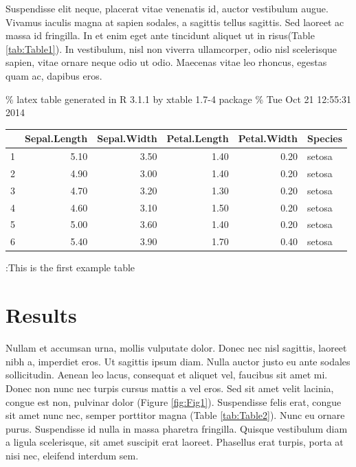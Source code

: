 \documentclass[10pt,a4paper,twocolumn]{article}
\begin{document}
Suspendisse elit neque, placerat vitae venenatis id, auctor vestibulum
augue. Vivamus iaculis magna at sapien sodales, a sagittis tellus
sagittis. Sed laoreet ac massa id fringilla. In et enim eget ante
tincidunt aliquet ut in risus(Table \ref{tab:Table1}). In vestibulum,
nisl non viverra ullamcorper, odio nisl scelerisque sapien, vitae ornare
neque odio ut odio. Maecenas vitae leo rhoncus, egestas quam ac, dapibus
eros.

\% latex table generated in R 3.1.1 by xtable 1.7-4 package \% Tue Oct
21 12:55:31 2014

\begin{table}[ht]
\centering
\begin{tabular}{rrrrrl}
  \hline
 & Sepal.Length & Sepal.Width & Petal.Length & Petal.Width & Species \\ 
  \hline
1 & 5.10 & 3.50 & 1.40 & 0.20 & setosa \\ 
  2 & 4.90 & 3.00 & 1.40 & 0.20 & setosa \\ 
  3 & 4.70 & 3.20 & 1.30 & 0.20 & setosa \\ 
  4 & 4.60 & 3.10 & 1.50 & 0.20 & setosa \\ 
  5 & 5.00 & 3.60 & 1.40 & 0.20 & setosa \\ 
  6 & 5.40 & 3.90 & 1.70 & 0.40 & setosa \\ 
   \hline
\end{tabular}
\end{table}

:This is the first example table\label{tab:Table1}

\section{Results}\label{results}

Nullam et accumsan urna, mollis vulputate dolor. Donec nec nisl
sagittis, laoreet nibh a, imperdiet eros. Ut sagittis ipsum diam. Nulla
auctor justo eu ante sodales sollicitudin. Aenean leo lacus, consequat
et aliquet vel, faucibus sit amet mi. Donec non nunc nec turpis cursus
mattis a vel eros. Sed sit amet velit lacinia, congue est non, pulvinar
dolor (Figure \ref{fig:Fig1}). Suspendisse felis erat, congue sit amet
nunc nec, semper porttitor magna (Table \ref{tab:Table2}). Nunc eu
ornare purus. Suspendisse id nulla in massa pharetra fringilla. Quisque
vestibulum diam a ligula scelerisque, sit amet suscipit erat laoreet.
Phasellus erat turpis, porta at nisi nec, eleifend interdum sem.
\end{document}
